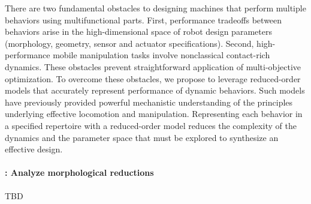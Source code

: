 \documentclass[11pt]{article}
\begin{document}
There are two fundamental obstacles to designing  machines that perform multiple behaviors using multifunctional parts.
First, 
performance tradeoffs between behaviors arise in the high-dimensional space of robot design parameters (morphology, geometry, sensor and actuator specifications).
Second, 
high-performance mobile manipulation tasks involve nonclassical contact-rich dynamics.
These obstacles prevent straightforward application of multi-objective optimization.
To overcome these obstacles,
we propose to leverage reduced-order models that accurately represent performance of dynamic behaviors.
Such models have previously provided powerful mechanistic understanding of the principles underlying effective locomotion and manipulation.
Representing each behavior in a specified repertoire with a reduced-order model reduces the complexity of the dynamics and the parameter space that must be explored to synthesize an effective design.








\paragraph{:  Analyze morphological reductions} 
TBD
\end{document}
